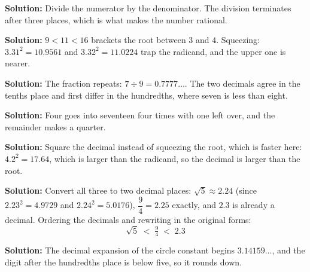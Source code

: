 \documentclass[12pt]{article}
\begin{document}




\textbf{Solution:} \quad Divide the numerator by the denominator. The division terminates
after three places, which is what makes the number rational. 


\textbf{Solution:} \quad $9 < 11 < 16$ brackets the root between $3$ and $4$. Squeezing:
$3.31^2 = 10.9561$ and $3.32^2 = 11.0224$ trap the radicand, and the upper one is nearer.


\textbf{Solution:} \quad The fraction repeats: $7 \div 9 = 0.7777\ldots$. The two decimals
agree in the tenths place and first differ in the hundredths, where seven is less than
eight. \ans{<}


\textbf{Solution:} \quad Four goes into seventeen four times with one left over, and the
remainder makes a quarter. 


\textbf{Solution:} \quad Square the decimal instead of squeezing the root, which is faster
here: $4.2^2 = 17.64$, which is larger than the radicand, so the decimal is larger than the
root. \ans{<}


\textbf{Solution:} \quad Convert all three to two decimal places: $\sqrt{5} \approx 2.24$
(since $2.23^2 = 4.9729$ and $2.24^2 = 5.0176$), $\dfrac{9}{4} = 2.25$ exactly, and $2.3$
is already a decimal. Ordering the decimals and rewriting in the original forms:
\[ \boxed{\sqrt{5} \;<\; \tfrac{9}{4} \;<\; 2.3} \]


\textbf{Solution:} \quad The decimal expansion of the circle constant begins
$3.14159\ldots$, and the digit after the hundredths place is below five, so it rounds down.

\end{document}
